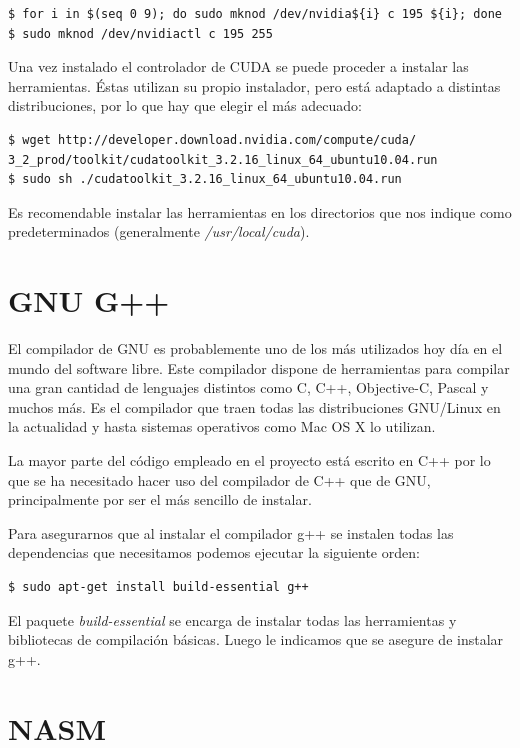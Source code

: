 \begin{verbatim}
$ for i in $(seq 0 9); do sudo mknod /dev/nvidia${i} c 195 ${i}; done
$ sudo mknod /dev/nvidiactl c 195 255
\end{verbatim}

Una vez instalado el controlador de CUDA se puede proceder a instalar las herramientas. Éstas utilizan su propio instalador, pero está adaptado a distintas distribuciones, por lo que hay que elegir el más adecuado:

\begin{verbatim}
$ wget http://developer.download.nvidia.com/compute/cuda/
3_2_prod/toolkit/cudatoolkit_3.2.16_linux_64_ubuntu10.04.run
$ sudo sh ./cudatoolkit_3.2.16_linux_64_ubuntu10.04.run
\end{verbatim}

Es recomendable instalar las herramientas en los directorios que nos indique como predeterminados (generalmente \emph{/usr/local/cuda}).

\section{GNU G++}

El compilador de GNU es probablemente uno de los más utilizados hoy día en el mundo del software libre. Este compilador dispone de herramientas para compilar una gran cantidad de lenguajes distintos como C, C++, Objective-C, Pascal y muchos más. Es el compilador que traen todas las distribuciones GNU/Linux en la actualidad y hasta sistemas operativos como Mac OS X lo utilizan.

La mayor parte del código empleado en el proyecto está escrito en C++ por lo que se ha necesitado hacer uso del compilador de C++ que de GNU, principalmente por ser el más sencillo de instalar.

Para asegurarnos que al instalar el compilador g++ se instalen todas las dependencias que necesitamos podemos ejecutar la siguiente orden:

\begin{verbatim}
$ sudo apt-get install build-essential g++
\end{verbatim}

El paquete \emph{build-essential} se encarga de instalar todas las herramientas y bibliotecas de compilación básicas. Luego le indicamos que se asegure de instalar g++.

\section{NASM}

